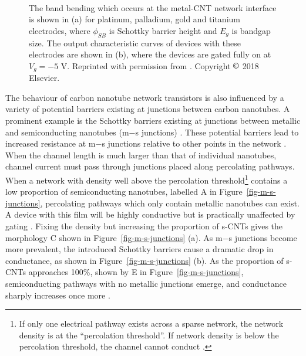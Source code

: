 \documentclass[
  a4paper,
]{scrbook}
\begin{document}
\begin{figure}
\begin{minipage}[t]{0.45\linewidth}
{{}

}

\end{minipage}%
%
\begin{minipage}[t]{0.01\linewidth}

{\centering 

~

}

\end{minipage}%

\caption[Figure which shows the band bending occurring at the metal-CNT
network interface alongside corresponding output characteristic
curves.]{\label{fig-band-bending}The band bending which occurs at the
metal-CNT network interface is shown in (a) for platinum, palladium,
gold and titanium electrodes, where \(\phi_{SB}\) is Schottky barrier
height and \(E_g\) is bandgap size. The output characteristic curves of
devices with these electrodes are shown in (b), where the devices are
gated fully on at \(V_g = -5\) V. Reprinted with permission from
\autocite{Bargaoui2018}. Copyright \(\copyright\) 2018 Elsevier.}

\end{figure}

The behaviour of carbon nanotube network transistors is also influenced
by a variety of potential barriers existing at junctions between carbon
nanotubes. A prominent example is the Schottky barriers existing at
junctions between metallic and semiconducting nanotubes (m\(-\)s
junctions) \autocite{Fuhrer2000,Topinka2009,Murugathas2019}. These
potential barriers lead to increased resistance at m\(-\)s junctions
relative to other points in the network \autocite{Fuhrer2000,Jang2015}.
When the channel length is much larger than that of individual
nanotubes, channel current must pass through junctions placed along
percolating pathways. When a network with density well above the
percolation threshold\footnote{If only one electrical pathway exists
  across a sparse network, the network density is at the ``percolation
  threshold''. If network density is below the percolation threshold,
  the channel cannot conduct \autocite{Hu2004,Topinka2009,Jang2015}.}
contains a low proportion of semiconducting nanotubes, labelled A in
Figure~\ref{fig-m-s-junctions}, percolating pathways which only contain
metallic nanotubes can exist. A device with this film will be highly
conductive but is practically unaffected by gating
\autocite{Fuhrer2000,Topinka2009}. Fixing the density but increasing the
proportion of s-CNTs gives the morphology C shown in
Figure~\ref{fig-m-s-junctions} (a). As m\(-\)s junctions become more
prevalent, the introduced Schottky barriers cause a dramatic drop in
conductance, as shown in Figure~\ref{fig-m-s-junctions} (b). As the
proportion of s-CNTs approaches 100\%, shown by E in
Figure~\ref{fig-m-s-junctions}, semiconducting pathways with no metallic
junctions emerge, and conductance sharply increases once more
\autocite{Topinka2009}.
\end{document}
